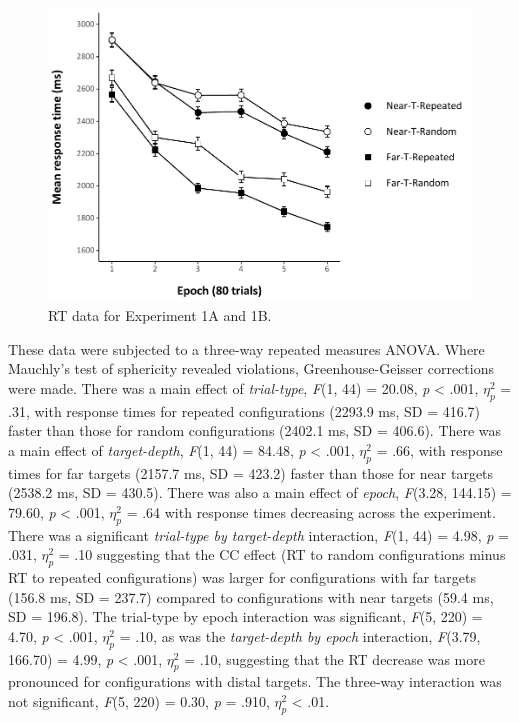 \documentclass[
  english,
  man,floatsintext]{apa7}
\begin{document}
\begin{figure}

{\centering \includegraphics[width=1\linewidth]{CCVR_manuscript_files/figure-latex/Exp1-RT-figure-1} 

}

\caption{RT data for Experiment 1A and 1B.}\label{fig:Exp1-RT-figure}
\end{figure}

These data were subjected to a three-way repeated measures ANOVA. Where Mauchly's test of sphericity revealed violations, Greenhouse-Geisser corrections were made. There was a main effect of \emph{trial-type}, \emph{F}(1, 44) = 20.08, \emph{p} \textless{} .001, \(\eta^2_p\) = .31, with response times for repeated configurations (2293.9 ms, SD = 416.7) faster than those for random configurations (2402.1 ms, SD = 406.6). There was a main effect of \emph{target-depth}, \emph{F}(1, 44) = 84.48, \emph{p} \textless{} .001, \(\eta^2_p\) = .66, with response times for far targets (2157.7 ms, SD = 423.2) faster than those for near targets (2538.2 ms, SD = 430.5). There was also a main effect of \emph{epoch}, \emph{F}(3.28, 144.15) = 79.60, \emph{p} \textless{} .001, \(\eta^2_p\) = .64 with response times decreasing across the experiment. There was a significant \emph{trial-type by target-depth} interaction, \emph{F}(1, 44) = 4.98, \emph{p} = .031, \(\eta^2_p\) = .10 suggesting that the CC effect (RT to random configurations minus RT to repeated configurations) was larger for configurations with far targets (156.8 ms, SD = 237.7) compared to configurations with near targets (59.4 ms, SD = 196.8). The trial-type by epoch interaction was significant, \emph{F}(5, 220) = 4.70, \emph{p} \textless{} .001, \(\eta^2_p\) = .10, as was the \emph{target-depth by epoch} interaction, \emph{F}(3.79, 166.70) = 4.99, \emph{p} \textless{} .001, \(\eta^2_p\) = .10, suggesting that the RT decrease was more pronounced for configurations with distal targets. The three-way interaction was not significant, \emph{F}(5, 220) = 0.30, \emph{p} = .910, \(\eta^2_p\) \textless{} .01.
\end{document}
